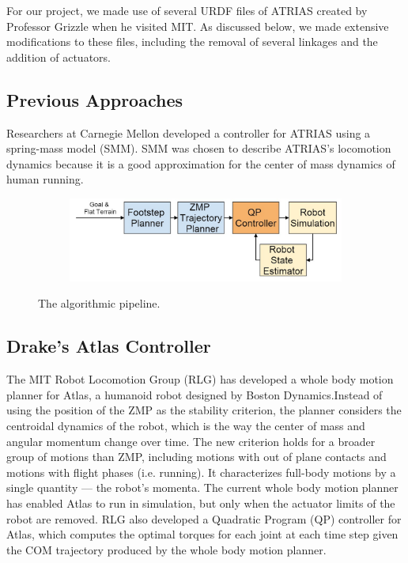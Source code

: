 \documentclass[letterpaper, 10 pt, conference]{ieeeconf}  %
\begin{document}
For our project, we made use of several URDF files of ATRIAS created by Professor Grizzle when he visited MIT. As discussed below, we made extensive modifications to these files, including the removal of several linkages and the addition of actuators.

\subsection{Previous Approaches}

Researchers at Carnegie Mellon developed a controller for ATRIAS using a spring-mass model (SMM). SMM was chosen to describe ATRIAS's locomotion dynamics because it is a good approximation for the center of mass dynamics of human running. \cite{hereid14}

  \begin{figure}[tbp]
  \centering
  \begin{subfigure}[b]{0.3\textwidth}
    \centering
    \includegraphics[width=\textwidth] {figures/6_832blockdiagram.jpg}
    \label{fig:pipeline1}
  \end{subfigure}\hfill
  \caption{The algorithmic pipeline.}
  \label{fig:pipeline}
\end{figure}

\subsection{Drake's Atlas Controller}

The MIT Robot Locomotion Group (RLG) has developed a whole body motion planner for Atlas, a humanoid robot designed by Boston Dynamics. ​Instead of using ​the position of the ​ZMP as ​the stability criterion, ​the planner considers the centroidal dynamics of the robot, which is the way the center of mass and angular momentum change over time. The new criterion holds for a broader group of motions than ZMP, including motions with out of plane contacts and motions with flight phases (i.e. running). It characterizes full-body motions by a single quantity --- the robot’s momenta. The current whole body motion planner has enabled Atlas to run in simulation, but only when the actuator limits of the robot are removed. \cite{dai14} RLG also developed a Quadratic Program (QP) controller for Atlas, which computes the optimal torques for each joint at each time step given the COM trajectory produced by the whole body motion planner. \cite{kuindersma13}
\end{document}
